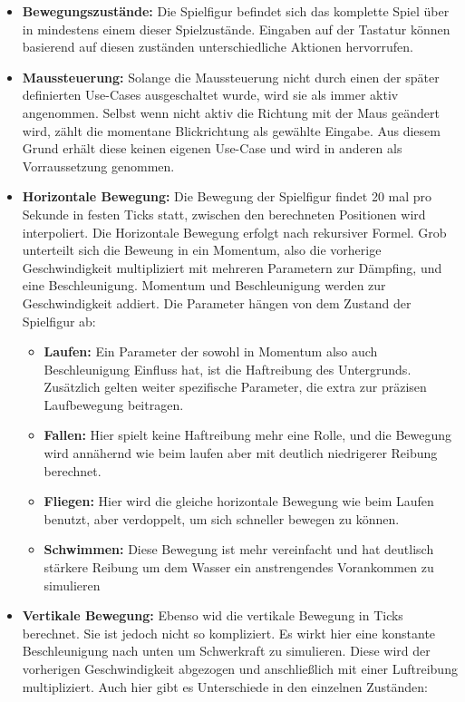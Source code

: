 \documentclass{article}
\begin{document}
\begin{itemize}
  \item \textbf{Bewegungszustände:} Die Spielfigur befindet sich das komplette Spiel über in mindestens einem dieser Spielzustände. Eingaben auf der Tastatur können basierend auf diesen zuständen unterschiedliche Aktionen hervorrufen.
  \item \textbf{Maussteuerung:} Solange die Maussteuerung nicht durch einen der später definierten Use-Cases ausgeschaltet wurde, wird sie als immer aktiv angenommen. Selbst wenn nicht aktiv die Richtung mit der Maus geändert wird, zählt die momentane Blickrichtung als gewählte Eingabe. Aus diesem Grund erhält diese keinen eigenen Use-Case und wird in anderen als Vorraussetzung genommen.
  \item \textbf{Horizontale Bewegung:} Die Bewegung der Spielfigur findet 20 mal pro Sekunde in festen Ticks statt, zwischen den berechneten Positionen wird interpoliert. Die Horizontale Bewegung erfolgt nach rekursiver Formel. Grob unterteilt sich die Beweung in ein Momentum, also die vorherige Geschwindigkeit multipliziert mit mehreren Parametern zur Dämpfing, und eine Beschleunigung. Momentum und Beschleunigung werden zur Geschwindigkeit addiert. Die Parameter hängen von dem Zustand der Spielfigur ab:
  \begin{itemize}
    \item \textbf{Laufen:} Ein Parameter der sowohl in Momentum also auch Beschleunigung Einfluss hat, ist die Haftreibung des Untergrunds. Zusätzlich gelten weiter spezifische Parameter, die extra zur präzisen Laufbewegung beitragen.
    \item \textbf{Fallen:} Hier spielt keine Haftreibung mehr eine Rolle, und die Bewegung wird annähernd wie beim laufen aber mit deutlich niedrigerer Reibung berechnet.
    \item \textbf{Fliegen:} Hier wird die gleiche horizontale Bewegung wie beim Laufen benutzt, aber verdoppelt, um sich schneller bewegen zu können.
    \item \textbf{Schwimmen:} Diese Bewegung ist mehr vereinfacht und hat deutlisch stärkere Reibung um dem Wasser ein anstrengendes Vorankommen zu simulieren
  \end{itemize}
  \item \textbf{Vertikale Bewegung:} Ebenso wid die vertikale Bewegung in Ticks berechnet. Sie ist jedoch nicht so kompliziert. Es wirkt hier eine konstante Beschleunigung nach unten um Schwerkraft zu simulieren. Diese wird der vorherigen Geschwindigkeit abgezogen und anschließlich mit einer Luftreibung multipliziert. Auch hier gibt es Unterschiede in den einzelnen Zuständen:

\end{itemize}
\end{document}
